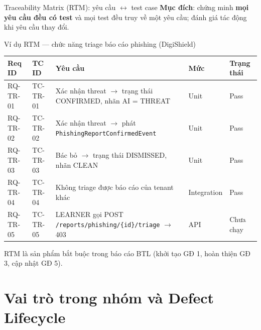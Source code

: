 \documentclass[aspectratio=169,12pt]{beamer}
\begin{document}
\begin{frame}{Traceability Matrix (RTM): yêu cầu $\leftrightarrow$ test case}
  \textbf{Mục đích}: chứng minh \textbf{mọi yêu cầu đều có test} và mọi test đều truy
  về một yêu cầu; đánh giá tác động khi yêu cầu thay đổi.

  \vspace{0.3em}
  \begin{exampleblock}{Ví dụ RTM --- chức năng triage báo cáo phishing (DigiShield)}
    \begin{center}
    \scriptsize
    \setlength{\tabcolsep}{3.5pt}
    \begin{tabular}{ll>{\raggedright\arraybackslash}p{5.4cm}ll}
      \toprule
      \textbf{Req ID} & \textbf{TC ID} & \textbf{Yêu cầu} & \textbf{Mức} & \textbf{Trạng thái} \\
      \midrule
      RQ-TR-01 & TC-TR-01 & Xác nhận threat $\to$ trạng thái CONFIRMED, nhãn AI = THREAT & Unit & Pass \\
      RQ-TR-02 & TC-TR-02 & Xác nhận threat $\to$ phát \texttt{PhishingReportConfirmedEvent} & Unit & Pass \\
      RQ-TR-03 & TC-TR-03 & Bác bỏ $\to$ trạng thái DISMISSED, nhãn CLEAN & Unit & Pass \\
      RQ-TR-04 & TC-TR-04 & Không triage được báo cáo của tenant khác & Integration & Pass \\
      RQ-TR-05 & TC-TR-05 & LEARNER gọi POST \texttt{/reports/phishing/\{id\}/triage} $\to$ 403 & API & Chưa chạy \\
      \bottomrule
    \end{tabular}
    \end{center}
  \end{exampleblock}

  \vspace{-0.2em}
  \small RTM là sản phẩm bắt buộc trong báo cáo BTL (khởi tạo GĐ 1, hoàn thiện GĐ 3,
  cập nhật GĐ 5).
\end{frame}

\section{Vai trò trong nhóm và Defect Lifecycle}
\end{document}
